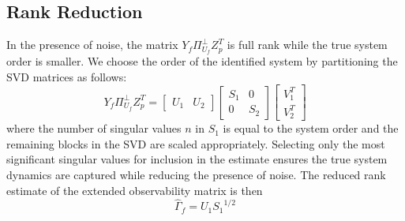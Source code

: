 \subsection{Rank Reduction}\label{sec:3_rank_reduction}
In the presence of noise, the matrix $Y_f\Pi_{U_f}^\perp Z_p^T$ is full rank while the true system order is smaller. We choose the order of the identified system by partitioning the SVD matrices as follows:
\begin{equation*}
Y_f\Pi_{U_f}^\perp Z_p^T = 
\left[\begin{array}{c|c}
U_1 & U_2
\end{array}\right]
\left[\begin{array}{c|c}
S_1 & 0 \\ \hline 0 & S_2
\end{array}\right]
\left[\begin{array}{c}
V_1^T \\ \hline V_2^T
\end{array}\right]
\end{equation*}
where the number of singular values $n$ in $S_1$ is equal to the system order and the remaining blocks in the SVD are scaled appropriately. Selecting only the most significant singular values for inclusion in the estimate ensures the true system dynamics are captured while reducing the presence of noise. The reduced rank estimate of the extended observability matrix is then
\begin{equation}
\hat{\Gamma}_f = U_1 {S_1}^{1/2}
\end{equation}


